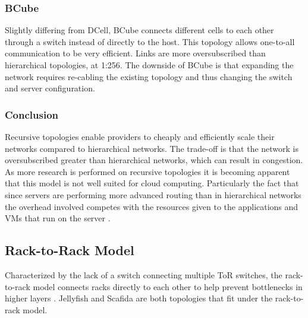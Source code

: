 \documentclass[12pt]{article}
\begin{document}


\subsubsection{BCube} \label{subp:bcube}

Slightly differing from DCell, BCube \cite{guo2009bcube} connects different cells to each other through a switch instead of directly to the host. This topology allows one-to-all communication to be very efficient. Links are more oversubscribed than hierarchical topologies, at 1:256. The downside of BCube is that expanding the network requires re-cabling the existing topology and thus changing the switch and server configuration.


\subsubsection{Conclusion} \label{ssub:recursive-concl}



Recursive topologies enable providers to cheaply and efficiently scale their networks compared to hierarchical networks. The trade-off is that the network is oversubscribed greater than hierarchical networks, which can result in congestion. As more research is performed on recursive topologies it is becoming apparent that this model is not well suited for cloud computing. Particularly the fact that since servers are performing more advanced routing than in hierarchical networks the overhead involved competes with the resources given to the applications and VMs that run on the server \cite{xia2016survey}.


\subsection{Rack-to-Rack Model} \label{sub:net-rack}

Characterized by the lack of a switch connecting multiple ToR switches, the rack-to-rack model connects racks directly to each other to help prevent bottlenecks in higher layers \cite{wang2015survey, xia2016survey}. Jellyfish \cite{singla2012jellyfish} and Scafida \cite{gyarmati2010scafida} are both topologies that fit under the rack-to-rack model.


\end{document}
